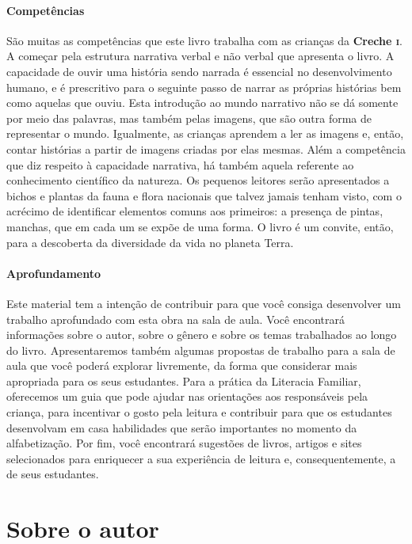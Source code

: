 \documentclass[11pt]{extarticle}
\begin{document}
\paragraph{Competências} 
São muitas as competências que este livro trabalha com as crianças
da \textbf{Creche \textsc{i}}. A começar pela estrutura narrativa verbal e não verbal
que apresenta o livro. A capacidade de ouvir uma história sendo narrada é essencial no 
desenvolvimento humano, e é prescritivo para o seguinte passo de narrar as próprias
histórias bem como aquelas que ouviu. Esta introdução ao mundo narrativo não se dá
somente por meio das palavras, mas também pelas imagens, que são outra forma de 
representar o mundo. Igualmente, as crianças aprendem a ler as imagens e, então, 
contar histórias a partir de imagens criadas por elas mesmas. 
Além a competência que diz respeito à capacidade narrativa, há também aquela
referente ao conhecimento científico da natureza. Os pequenos leitores serão 
apresentados a bichos e plantas da fauna e flora nacionais que talvez jamais tenham visto,
com o acrécimo de identificar elementos comuns aos primeiros: a presença de pintas, 
manchas, que em cada um se expõe de uma forma. O livro é um convite, então, para
a descoberta da diversidade da vida no planeta Terra. 

\paragraph{Aprofundamento} 
Este material tem a 
intenção de contribuir para que você consiga desenvolver um trabalho aprofundado 
com esta obra na sala de aula. Você encontrará informações sobre o autor, sobre 
o gênero e sobre os temas trabalhados ao longo do livro. Apresentaremos também 
algumas propostas de trabalho para a sala de aula que você poderá explorar livremente, 
da forma que considerar mais apropriada para os seus estudantes. Para a prática 
da Literacia Familiar, oferecemos um guia que pode ajudar nas orientações aos 
responsáveis pela criança, para incentivar o gosto pela leitura e contribuir para 
que os estudantes desenvolvam em casa habilidades que serão importantes no momento 
da alfabetização. Por fim, você encontrará sugestões de livros, artigos e sites 
selecionados para enriquecer a sua experiência de leitura e, 
consequentemente, a de seus estudantes.



\section{Sobre o autor}
\end{document}
